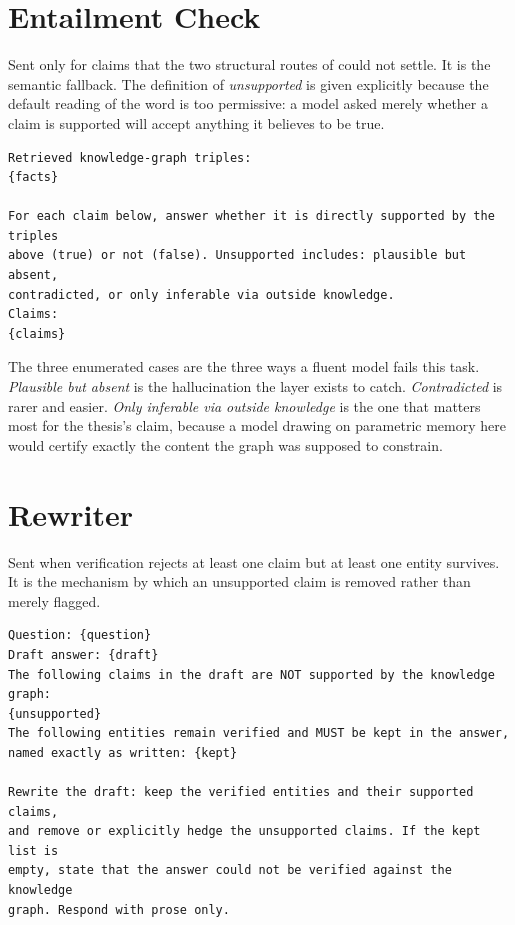 \section{Entailment Check}\label{app:prompt-entail}

Sent only for claims that the two structural routes of
 could not settle. It is the semantic fallback. The
definition of \emph{unsupported} is given explicitly because the default
reading of the word is too permissive: a model asked merely whether a claim is
supported will accept anything it believes to be true.

\begin{lstlisting}[style=verbatimblock]
Retrieved knowledge-graph triples:
{facts}

For each claim below, answer whether it is directly supported by the triples
above (true) or not (false). Unsupported includes: plausible but absent,
contradicted, or only inferable via outside knowledge.
Claims:
{claims}
\end{lstlisting}

The three enumerated cases are the three ways a fluent model fails this task.
\emph{Plausible but absent} is the hallucination the layer exists to catch.
\emph{Contradicted} is rarer and easier. \emph{Only inferable via outside
knowledge} is the one that matters most for the thesis's claim, because a model
drawing on parametric memory here would certify exactly the content the graph
was supposed to constrain.

\section{Rewriter}\label{app:prompt-rewrite}

Sent when verification rejects at least one claim but at least one entity
survives. It is the mechanism by which an unsupported claim is removed rather
than merely flagged.

\begin{lstlisting}[style=verbatimblock]
Question: {question}
Draft answer: {draft}
The following claims in the draft are NOT supported by the knowledge graph:
{unsupported}
The following entities remain verified and MUST be kept in the answer,
named exactly as written: {kept}

Rewrite the draft: keep the verified entities and their supported claims,
and remove or explicitly hedge the unsupported claims. If the kept list is
empty, state that the answer could not be verified against the knowledge
graph. Respond with prose only.
\end{lstlisting}

